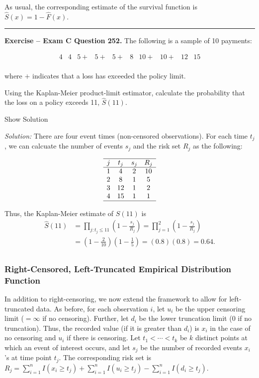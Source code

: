 \documentclass[]{book}
\theoremstyle{definition}
\theoremstyle{definition}
\theoremstyle{definition}
\theoremstyle{remark}
\begin{document}
As usual, the corresponding estimate of the survival function is
\(\hat{S}(x) = 1 - \hat{F}(x)\).

\begin{center}\rule{0.5\linewidth}{\linethickness}\end{center}

\textbf{Exercise -- Exam C Question 252.} The following is a sample of
10 payments:

\[\begin{array}{cccccccccc}
4 &4 &5+ &5+ &5+ &8 &10+ &10+ &12 &15 \\
\end{array}\]

where \(+\) indicates that a loss has exceeded the policy limit.

Using the Kaplan-Meier product-limit estimator, calculate the
probability that the loss on a policy exceeds 11, \(\hat{S}(11)\).

Show Solution

\hypertarget{toggleExamC252}{}
\emph{Solution:} There are four event times (non-censored observations).
For each time \(t_j\), we can calcuate the number of events \(s_j\) and
the risk set \(R_j\) as the following:

\[\begin{array}{cccc}
\hline
j & t_j & s_j & R_j \\
\hline
1 & 4 & 2 & 10 \\
2 & 8 & 1 & 5 \\
3 & 12 & 1 & 2 \\
4 & 15 & 1 & 1 \\
\hline
\end{array}\]

Thus, the Kaplan-Meier estimate of \(S(11)\) is \[\begin{aligned}
\hat{S}(11) &= \prod_{j:t_j\leq 11} \left( 1- \frac{s_j}{R_j} \right) =  \prod_{j=1}^{2} \left( 1- \frac{s_j}{R_j} \right)\\
&= \left(1-\frac{2}{10} \right) \left(1-\frac{1}{5} \right) = (0.8)(0.8)= 0.64. \\
\end{aligned}\]

\subsubsection{Right-Censored, Left-Truncated Empirical Distribution
Function}\label{right-censored-left-truncated-empirical-distribution-function}

In addition to right-censoring, we now extend the framework to allow for
left-truncated data. As before, for each observation \(i\), let \(u_i\)
be the upper censoring limit (\(=\infty\) if no censoring). Further, let
\(d_i\) be the lower truncation limit (0 if no truncation). Thus, the
recorded value (if it is greater than \(d_i\)) is \(x_i\) in the case of
no censoring and \(u_i\) if there is censoring. Let
\(t_{1} <\cdots< t_{k}\) be \(k\) distinct points at which an event of
interest occurs, and let \(s_j\) be the number of recorded events
\(x_i\)'s at time point \(t_{j}\). The corresponding risk set is
\(R_j = \sum_{i=1}^n I(x_i \geq t_{j}) + \sum_{i=1}^n I(u_i \geq t_{j}) - \sum_{i=1}^n I(d_i \geq t_{j})\).
\end{document}
